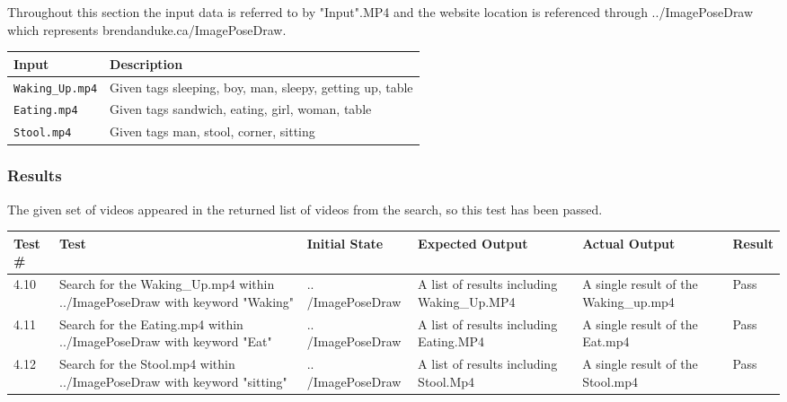 \documentclass{scrreprt}
\begin{document}
Throughout this section the input data is referred to by "Input".MP4 and the website location is referenced through ../ImagePoseDraw which represents brendanduke.ca/ImagePoseDraw.

\begin{table}[H]
        \centering
        \begin{tabular}{p{3cm}p{6cm}}
                \hline\hline
                Input & Description\\
                \hline\hline
                \verb|Waking_Up.mp4| &  Given tags sleeping, boy, man, sleepy, getting up, table\\
                \hline
                \verb|Eating.mp4| &  Given tags sandwich, eating, girl, woman, table\\
                \hline
                \verb|Stool.mp4| &  Given tags man, stool, corner, sitting\\
                \hline
        \end{tabular}
\end{table}

\subsubsection{Results}

The given set of videos appeared in the returned list of videos from the search, so this test has been passed.

\begin{table}[H]
        \centering
        \begin{tabular}[t]{||p{0.75cm}|p{4cm}|p{2.5cm}|p{3cm}|p{2.5cm}|p{0.75cm}||}
                \hline
                \textbf Test \# & \textbf Test & \textbf Initial State & \textbf Expected Output & \textbf Actual Output & \textbf Result\\
                \hline\hline
                4.10 & Search for the Waking_Up.mp4 within ../ImagePoseDraw with keyword "Waking" & .. /ImagePoseDraw & A list of results including Waking_Up.MP4 & A single result of the Waking_up.mp4 & Pass\\
                \hline
                4.11 & Search for the Eating.mp4 within ../ImagePoseDraw with keyword "Eat" & .. /ImagePoseDraw & A list of results including Eating.MP4 & A single result of the Eat.mp4 & Pass\\
                \hline
                4.12 & Search for the Stool.mp4 within ../ImagePoseDraw with keyword "sitting" & .. /ImagePoseDraw & A list of results including Stool.Mp4 & A single result of the Stool.mp4 & Pass\\
                \hline
        \end{tabular}
\end{table}
\end{document}
